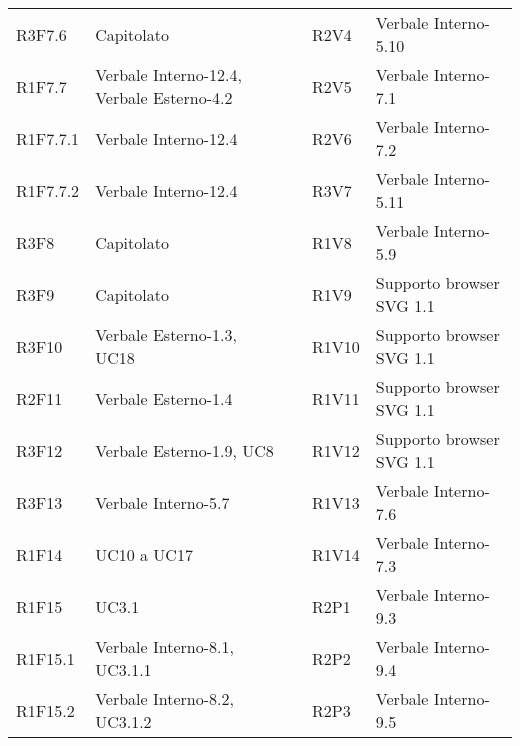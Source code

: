 \begin{center}
\begin{longtable}{C{2cm} | C{5cm} C{0.2cm} C{2cm} | C{5cm}}
R3F7.6 & Capitolato &  & R2V4 & Verbale Interno-5.10\\

R1F7.7 & Verbale Interno-12.4, Verbale Esterno-4.2 &  & R2V5 & Verbale Interno-7.1\\

R1F7.7.1 & Verbale Interno-12.4 &  & R2V6 & Verbale Interno-7.2\\

R1F7.7.2 & Verbale Interno-12.4 &  & R3V7 & Verbale Interno-5.11\\

R3F8 & Capitolato &  & R1V8 & Verbale Interno-5.9\\

R3F9 & Capitolato &  & R1V9 & Supporto browser SVG 1.1\\

R3F10 & Verbale Esterno-1.3, UC18 &  & R1V10 & Supporto browser SVG 1.1\\

R2F11 & Verbale Esterno-1.4 &  & R1V11 & Supporto browser SVG 1.1\\

R3F12 & Verbale Esterno-1.9, UC8 &  & R1V12 & Supporto browser SVG 1.1 \\

R3F13 & Verbale Interno-5.7 &  & R1V13 & Verbale Interno-7.6\\

R1F14 & UC10 a UC17 &  & R1V14 & Verbale Interno-7.3 \\

R1F15 & UC3.1 &  & R2P1 & Verbale Interno-9.3 \\

R1F15.1 & Verbale Interno-8.1, UC3.1.1 &  & R2P2 & Verbale Interno-9.4 \\

R1F15.2 & Verbale Interno-8.2, UC3.1.2 &  & R2P3 & Verbale Interno-9.5 \\

\end{longtable}
\end{center}




























